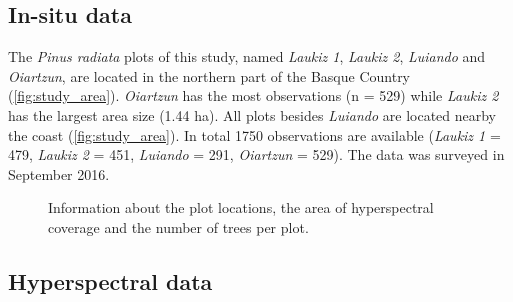 \documentclass[review]{elsarticle}
\begin{document}
\subsection{In-situ data}

The \textit{Pinus radiata} plots of this study, named \textit{Laukiz 1}, \textit{Laukiz 2}, \textit{Luiando} and \textit{Oiartzun}, are located in the northern part of the Basque Country (\autoref{fig:study_area}).
\textit{Oiartzun} has the most observations (n = 529) while \textit{Laukiz 2} has the largest area size (1.44 ha).
All plots besides \textit{Luiando} are located nearby the coast (\autoref{fig:study_area}).
In total 1750 observations are available (\textit{Laukiz 1} = 479, \textit{Laukiz 2} = 451, \textit{Luiando} = 291, \textit{Oiartzun} = 529).
The data was surveyed in September 2016.

\begin{figure} [t!]
	\begin{center}
		\caption{Information about the plot locations, the area of hyperspectral coverage and the number of trees per plot.}
		\label{fig:study_area}
	\end{center}
\end{figure}

\subsection{Hyperspectral data}
\end{document}
